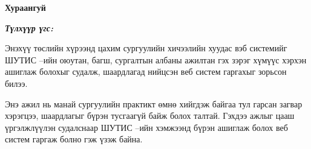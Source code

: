 

\begin{center}
{\scshape\Large \univname\par} %
{\scshape\large \facname\par}\vspace{0.5cm} %
{\huge\textbf{{Хураангуй}} \par}
\bigskip
{\Large{\ttitle} \par} %
\bigskip

{\normalsize \shortname \par} %
\addressname
\end{center}

\textit{\textbf{Түлхүүр үгс: }}
\bigskip

Энэхүү төслийн хүрээнд цахим сургуулийн хичээлийн хуудас вэб системийг ШУТИС --ийн оюутан, багш, сургалтын албаны ажилтан гэх зэрэг хүмүүс хэрхэн ашиглаж болохыг судалж, шаардлагад нийцсэн веб систем гаргахыг зорьсон билээ. 

Энэ ажил нь манай сургуулийн практикт өмнө хийгдэж байгаа тул гарсан загвар хэрэгцээ, шаардлагыг бүрэн тусгаагүй байж болох талтай. Гэхдээ ажлыг цааш үргэлжлүүлэн судалснаар ШУТИС --ийн хэмжээнд бүрэн ашиглаж болох веб систем гаргаж болно гэж үзэж байна.



